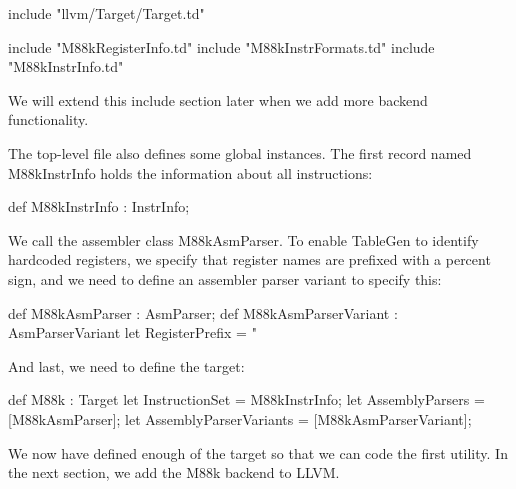 \begin{cpp}
include "llvm/Target/Target.td"

include "M88kRegisterInfo.td"
include "M88kInstrFormats.td"
include "M88kInstrInfo.td"
\end{cpp}

We will extend this include section later when we add more backend functionality.

The top-level file also defines some global instances. The first record named M88kInstrInfo holds the information about all instructions:

\begin{cpp}
def M88kInstrInfo : InstrInfo;
\end{cpp}

We call the assembler class M88kAsmParser. To enable TableGen to identify hardcoded registers, we specify that register names are prefixed with a percent sign, and we need to define an assembler parser variant to specify this:

\begin{cpp}
def M88kAsmParser : AsmParser;
def M88kAsmParserVariant : AsmParserVariant {
    let RegisterPrefix = "%
}
\end{cpp}

And last, we need to define the target:

\begin{cpp}
def M88k : Target {
    let InstructionSet = M88kInstrInfo;
    let AssemblyParsers = [M88kAsmParser];
    let AssemblyParserVariants = [M88kAsmParserVariant];
}
\end{cpp}

We now have defined enough of the target so that we can code the first utility. In the next section, we add the M88k backend to LLVM.





